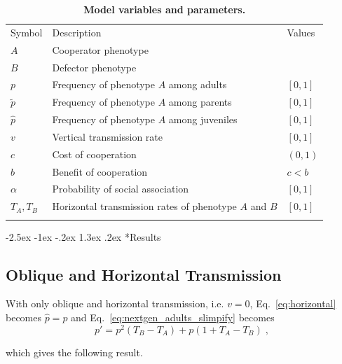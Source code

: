 \documentclass[12pt]{extarticle}
\makeatletter
\renewcommand\section{\@startsection {section}{1}{\z@}%
     {-2.5ex \@plus -1ex \@minus -.2ex}%
     {1.3ex \@plus.2ex}%
    {\Large\bfseries}}
\makeatother
\begin{document}
\bigskip
\begin{table}[h]
\centering
\caption{\textbf{Model variables and parameters.}
}
\begin{tabular}{lll}
\toprule
Symbol & Description & Values \\ \cmidrule(r){1-3}
$A$ & Cooperator phenotype & \\
$B$ & Defector phenotype & \\
$p$ & Frequency of phenotype $A$ among adults & $[0,1]$ \\
$\tilde p$ & Frequency of phenotype $A$ among parents & $[0,1]$ \\
$\hat p$ & Frequency of phenotype $A$ among juveniles & $[0,1]$ \\
$v$ & Vertical transmission rate & $[0,1]$ \\
$c$ & Cost of cooperation & $(0,1)$ \\
$b$ & Benefit of cooperation & $c<b$ \\
$\alpha$ & Probability of social association & $[0,1]$ \\
$T_A, T_B$ & Horizontal transmission rates of phenotype $A$ and $B$ & $[0,1]$ \\
\\ \bottomrule
\end{tabular}
\label{table:vars_params}
\end{table}


\section*{Results}


\subsection*{Oblique and Horizontal Transmission}

With only oblique and horizontal transmission, i.e. $v = 0$, Eq.\ \ref{eq:horizontal} becomes $\hat{p}=p$ and Eq.\ \ref{eq:nextgen_adults_slimpify} becomes %
\begin{equation}  \label{eq:nextgen_parents_oblique_only}
p' = p^2 (T_B-T_A) + p (1+T_A-T_B) \;,
\end{equation}

which gives the following result.\\
\end{document}
